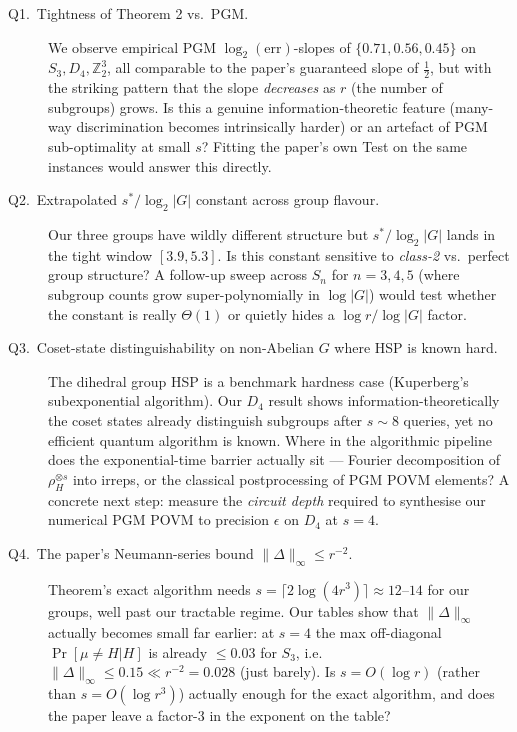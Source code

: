 \begin{description}
\item[Q1.\ Tightness of Theorem 2 vs.\ PGM.]  We observe empirical PGM
  $\log_2(\mathrm{err})$-slopes of $\{0.71, 0.56, 0.45\}$ on
  $S_3, D_4, \mathbb{Z}_2^{3}$, all comparable to the paper's guaranteed slope
  of $\tfrac12$, but with the striking pattern that the slope \emph{decreases}
  as $r$ (the number of subgroups) grows.  Is this a genuine
  information-theoretic feature (many-way discrimination becomes intrinsically
  harder) or an artefact of PGM sub-optimality at small $s$?  Fitting the
  paper's own \textsf{Test} on the same instances would answer this directly.

\item[Q2.\ Extrapolated $s^*/\log_2|G|$ constant across group flavour.]  Our
  three groups have wildly different structure but $s^*/\log_2|G|$ lands in
  the tight window $[3.9, 5.3]$.  Is this constant sensitive to
  \emph{class-2} vs.\ perfect group structure?  A follow-up sweep across
  $S_n$ for $n=3,4,5$ (where subgroup counts grow super-polynomially in
  $\log|G|$) would test whether the constant is really $\Theta(1)$ or
  quietly hides a $\log r / \log|G|$ factor.

\item[Q3.\ Coset-state distinguishability on non-Abelian $G$ where HSP is
  known hard.]  The dihedral group HSP is a benchmark hardness case
  (Kuperberg's subexponential algorithm).  Our $D_4$ result shows
  information-theoretically the coset states already distinguish subgroups
  after $s\sim 8$ queries, yet no efficient quantum algorithm is known.
  Where in the algorithmic pipeline does the exponential-time barrier
  actually sit --- Fourier decomposition of $\rho_H^{\otimes s}$ into
  irreps, or the classical postprocessing of PGM POVM elements?  A concrete
  next step: measure the \emph{circuit depth} required to synthesise our
  numerical PGM POVM to precision $\epsilon$ on $D_4$ at $s=4$.

\item[Q4.\ The paper's Neumann-series bound
  $\|\Delta\|_\infty \le r^{-2}$.]  Theorem's exact algorithm needs
  $s = \lceil 2\log(4r^3)\rceil \approx 12$--$14$ for our groups, well past
  our tractable regime.  Our tables show that $\|\Delta\|_\infty$ actually
  becomes small far earlier: at $s=4$ the max off-diagonal
  $\Pr[\mu\ne H|H]$ is already $\le 0.03$ for $S_3$, i.e.\ $\|\Delta\|_\infty
  \le 0.15 \ll r^{-2} = 0.028$ (just barely).  Is $s = O(\log r)$ (rather than
  $s = O(\log r^3)$) actually enough for the exact algorithm, and does the
  paper leave a factor-3 in the exponent on the table?


\end{description}
